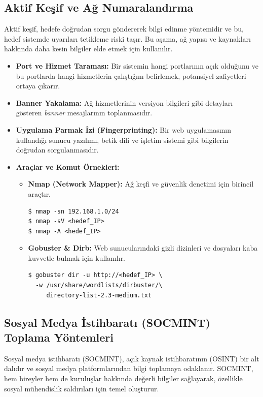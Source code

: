 \subsection{Aktif Keşif ve Ağ Numaralandırma}
Aktif keşif, hedefe doğrudan sorgu göndererek bilgi edinme yöntemidir ve bu, hedef sistemde uyarıları tetikleme riski taşır. Bu aşama, ağ yapısı ve kaynakları hakkında daha kesin bilgiler elde etmek için kullanılır.
\begin{itemize}
\item \textbf{Port ve Hizmet Taraması:} Bir sistemin hangi portlarının açık olduğunu ve bu portlarda hangi hizmetlerin çalıştığını belirlemek, potansiyel zafiyetleri ortaya çıkarır.
\item \textbf{Banner Yakalama:} Ağ hizmetlerinin versiyon bilgileri gibi detayları gösteren \textit{banner} mesajlarının toplanmasıdır.
\item \textbf{Uygulama Parmak İzi (Fingerprinting):} Bir web uygulamasının kullandığı sunucu yazılımı, betik dili ve işletim sistemi gibi bilgilerin doğrudan sorgulanmasıdır.
\item \textbf{Araçlar ve Komut Örnekleri:}
\begin{itemize}
    \item \textbf{Nmap (Network Mapper):} Ağ keşfi ve güvenlik denetimi için birincil araçtır.
    \begin{verbatim}
$ nmap -sn 192.168.1.0/24
$ nmap -sV <hedef_IP>
$ nmap -A <hedef_IP>
    \end{verbatim}
    \item \textbf{Gobuster \& Dirb:} Web sunucularındaki gizli dizinleri ve dosyaları kaba kuvvetle bulmak için kullanılır.
    \begin{verbatim}
$ gobuster dir -u http://<hedef_IP> \
  -w /usr/share/wordlists/dirbuster/\
     directory-list-2.3-medium.txt
    \end{verbatim}
\end{itemize}
\end{itemize}

\subsection{Sosyal Medya İstihbaratı (SOCMINT) Toplama Yöntemleri}

Sosyal medya istihbaratı (SOCMINT), açık kaynak istihbaratının (OSINT) bir alt dalıdır ve sosyal medya platformlarından bilgi toplamaya odaklanır. SOCMINT, hem bireyler hem de kuruluşlar hakkında değerli bilgiler sağlayarak, özellikle sosyal mühendislik saldırıları için temel oluşturur.

